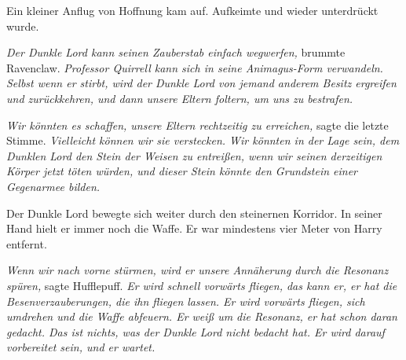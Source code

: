 Ein kleiner Anflug von Hoffnung kam auf. Aufkeimte und wieder unterdrückt wurde.

\emph{Der Dunkle Lord kann seinen Zauberstab einfach wegwerfen,} brummte Ravenclaw. \emph{Professor Quirrell kann sich in seine Animagus-Form verwandeln. Selbst wenn er stirbt, wird der Dunkle Lord von jemand anderem Besitz ergreifen und zurückkehren, und dann unsere Eltern foltern, um uns zu bestrafen.}

\emph{Wir könnten es schaffen, unsere Eltern rechtzeitig zu erreichen,} sagte die letzte Stimme. \emph{Vielleicht können wir sie verstecken. Wir könnten in der Lage sein, dem Dunklen Lord den Stein der Weisen zu entreißen, wenn wir seinen derzeitigen Körper jetzt töten würden, und dieser Stein könnte den Grundstein einer Gegenarmee bilden.}

Der Dunkle Lord bewegte sich weiter durch den steinernen Korridor. In seiner Hand hielt er immer noch die Waffe. Er war mindestens vier Meter von Harry entfernt.

\emph{Wenn wir nach vorne stürmen, wird er unsere Annäherung durch die Resonanz spüren,} sagte Hufflepuff. \emph{Er wird schnell vorwärts fliegen, das kann er, er hat die Besenverzauberungen, die ihn fliegen lassen. Er wird vorwärts fliegen, sich umdrehen und die Waffe abfeuern. Er weiß um die Resonanz, er hat schon daran gedacht. Das ist nichts, was der Dunkle Lord nicht bedacht hat. Er wird darauf vorbereitet sein, und er wartet.}

